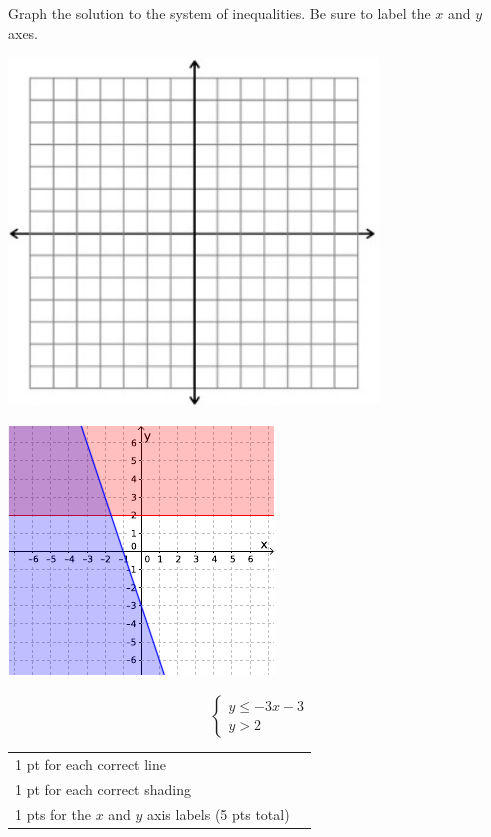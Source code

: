 {
	Graph the solution to the system of inequalities. Be sure to label the $x$ and $y$ axes. \begin{onlyproblem}\begin{center}\includegraphics{fig-graphpaper.png}\end{center}\end{onlyproblem} \begin{onlysolution}\begin{center}\includegraphics{fig095-12-5-b-answer}\end{center}\end{onlysolution}
	$$\begin{cases}y\leq -3x-3 \\ y>2 \end{cases}$$
}
{
	\begin{tabular}{l r}
	1 pt for each correct line\\
	1 pt for each correct shading\\
	1 pts for the $x$ and $y$ axis labels (5 pts total)\\
	\end{tabular}
}

